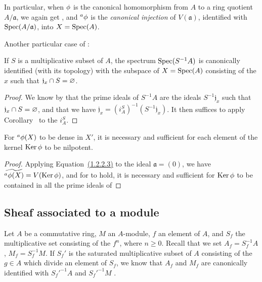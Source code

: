 \begin{env}[1.2.5]
\label{I.1.2.5}
In particular, when $\phi$ is the canonical homomorphism from $A$ to a ring quotient $A/\mathfrak{a}$, we again get , and ${}^a\phi$ is the \emph{canonical injection} of $V(\mathfrak{a})$, identified with $\operatorname{Spec}(A/\mathfrak{a})$, into $X=\operatorname{Spec}(A)$.
\end{env}

Another particular case of :
\begin{corollary}[1.2.6]
\label{I.1.2.6}
If $S$ is a multiplicative subset of $A$, the spectrum $\operatorname{Spec}(S^{-1}A)$ is canonically identified (with its topology) with the subspace of $X=\operatorname{Spec}(A)$ consisting of the $x$ such that $\mathfrak{j}_x\cap S=\varnothing$.
\end{corollary}

\begin{proof}
We know by  that the prime ideals of $S^{-1}A$ are the ideals $S^{-1}\mathfrak{j}_x$ such that $\mathfrak{j}_x\cap S=\varnothing$, and that we have $\mathfrak{j}_x=(i_A^S)^{-1}(S^{-1}\mathfrak{j}_x)$.
It then suffices to apply Corollary~ to the $i_A^S$.
\end{proof}

\begin{corollary}[1.2.7]
\label{I.1.2.7}
For ${}^a\phi(X)$ to be dense in $X'$, it is necessary and sufficient for each element of the kernel $\operatorname{Ker}\phi$ to be nilpotent.
\end{corollary}

\begin{proof}
Applying Equation~\hyperref[1.1.2.2]{(1.2.2.3)} to the ideal $\mathfrak{a}=(0)$, we have $\widetilde{{}^a\phi(X)}=V(\operatorname{Ker}\phi)$, and for  to hold, it is necessary and sufficient for $\operatorname{Ker}\phi$ to be contained in all the prime ideals of 
\end{proof}

\subsection{Sheaf associated to a module}
\label{subsection:I.1.3}

\begin{env}[1.3.1]
\label{I.1.3.1}
Let $A$ be a commutative ring, $M$ an $A$-module, $f$ an element of $A$, and $S_f$ the multiplicative set consisting of the $f^n$, where $n\geq 0$.
Recall that we set $A_f=S_f^{-1}A$, $M_f=S_f^{-1}M$.
If $S_f'$ is the saturated multiplicative subset of $A$ consisting of the $g\in A$ which divide an element of $S_f$, we know that $A_f$ and $M_f$ are canonically identified with ${S_f'}^{-1}A$ and ${S_f'}^{-1}M$ .
\end{env}

